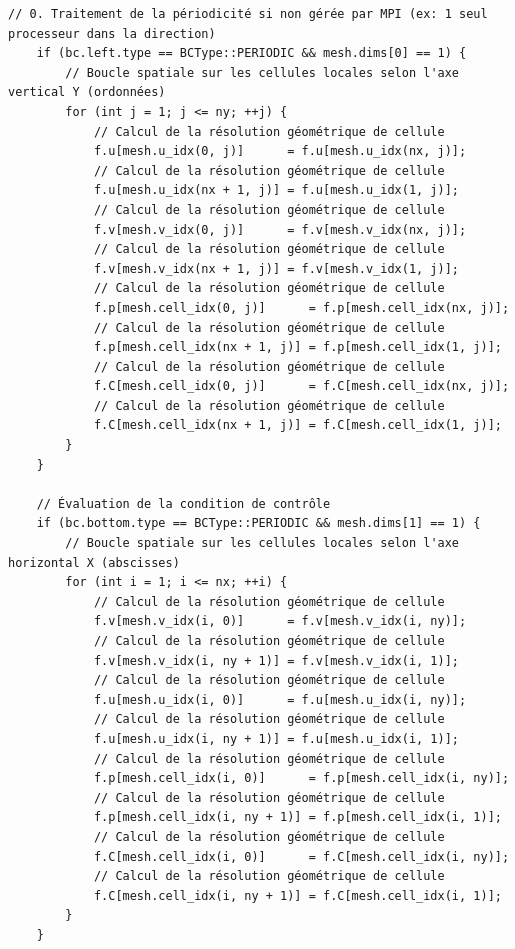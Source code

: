 \documentclass[10pt,a4paper,oneside]{book}
\begin{document}
\begin{lstlisting}[language={[11]C++}]
    // 0. Traitement de la périodicité si non gérée par MPI (ex: 1 seul processeur dans la direction)
    if (bc.left.type == BCType::PERIODIC && mesh.dims[0] == 1) {
        // Boucle spatiale sur les cellules locales selon l'axe vertical Y (ordonnées)
        for (int j = 1; j <= ny; ++j) {
            // Calcul de la résolution géométrique de cellule
            f.u[mesh.u_idx(0, j)]      = f.u[mesh.u_idx(nx, j)];
            // Calcul de la résolution géométrique de cellule
            f.u[mesh.u_idx(nx + 1, j)] = f.u[mesh.u_idx(1, j)];
            // Calcul de la résolution géométrique de cellule
            f.v[mesh.v_idx(0, j)]      = f.v[mesh.v_idx(nx, j)];
            // Calcul de la résolution géométrique de cellule
            f.v[mesh.v_idx(nx + 1, j)] = f.v[mesh.v_idx(1, j)];
            // Calcul de la résolution géométrique de cellule
            f.p[mesh.cell_idx(0, j)]      = f.p[mesh.cell_idx(nx, j)];
            // Calcul de la résolution géométrique de cellule
            f.p[mesh.cell_idx(nx + 1, j)] = f.p[mesh.cell_idx(1, j)];
            // Calcul de la résolution géométrique de cellule
            f.C[mesh.cell_idx(0, j)]      = f.C[mesh.cell_idx(nx, j)];
            // Calcul de la résolution géométrique de cellule
            f.C[mesh.cell_idx(nx + 1, j)] = f.C[mesh.cell_idx(1, j)];
        }
    }

    // Évaluation de la condition de contrôle
    if (bc.bottom.type == BCType::PERIODIC && mesh.dims[1] == 1) {
        // Boucle spatiale sur les cellules locales selon l'axe horizontal X (abscisses)
        for (int i = 1; i <= nx; ++i) {
            // Calcul de la résolution géométrique de cellule
            f.v[mesh.v_idx(i, 0)]      = f.v[mesh.v_idx(i, ny)];
            // Calcul de la résolution géométrique de cellule
            f.v[mesh.v_idx(i, ny + 1)] = f.v[mesh.v_idx(i, 1)];
            // Calcul de la résolution géométrique de cellule
            f.u[mesh.u_idx(i, 0)]      = f.u[mesh.u_idx(i, ny)];
            // Calcul de la résolution géométrique de cellule
            f.u[mesh.u_idx(i, ny + 1)] = f.u[mesh.u_idx(i, 1)];
            // Calcul de la résolution géométrique de cellule
            f.p[mesh.cell_idx(i, 0)]      = f.p[mesh.cell_idx(i, ny)];
            // Calcul de la résolution géométrique de cellule
            f.p[mesh.cell_idx(i, ny + 1)] = f.p[mesh.cell_idx(i, 1)];
            // Calcul de la résolution géométrique de cellule
            f.C[mesh.cell_idx(i, 0)]      = f.C[mesh.cell_idx(i, ny)];
            // Calcul de la résolution géométrique de cellule
            f.C[mesh.cell_idx(i, ny + 1)] = f.C[mesh.cell_idx(i, 1)];
        }
    }


\end{lstlisting}
\end{document}
